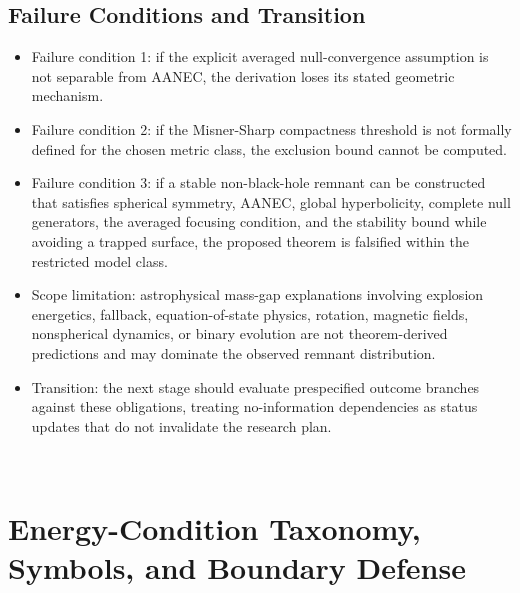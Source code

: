 \documentclass[conference]{IEEEtran}
\begin{document}
\subsection{Failure Conditions and Transition}
\begin{itemize}
\item Failure condition 1: if the explicit averaged null-convergence assumption is not separable from AANEC, the derivation loses its stated geometric mechanism.
\item Failure condition 2: if the Misner-Sharp compactness threshold is not formally defined for the chosen metric class, the exclusion bound cannot be computed.
\item Failure condition 3: if a stable non-black-hole remnant can be constructed that satisfies spherical symmetry, AANEC, global hyperbolicity, complete null generators, the averaged focusing condition, and the stability bound while avoiding a trapped surface, the proposed theorem is falsified within the restricted model class.
\item Scope limitation: astrophysical mass-gap explanations involving explosion energetics, fallback, equation-of-state physics, rotation, magnetic fields, nonspherical dynamics, or binary evolution are not theorem-derived predictions and may dominate the observed remnant distribution.
\item Transition: the next stage should evaluate prespecified outcome branches against these obligations, treating no-information dependencies as status updates that do not invalidate the research plan.
\end{itemize}~\cite{cite_07d6df5d6978a1fc,cite_0ed84243cf171bc4,cite_42e341ff6471ce89,cite_72d7ff391b29c495,cite_789b47fb0241d9ae,cite_7a407c865faafd11,cite_7a44e6730c44cb39,cite_977568cf7b8a55bf,cite_c369df652181e8f7,cite_cbbced417410bc6c,cite_f634820e22d7a238,cite_fd0f77b2a173c0ab}

\appendices
\section{Energy-Condition Taxonomy, Symbols, and Boundary Defense}
\end{document}
